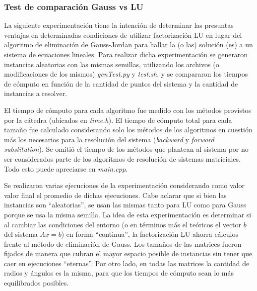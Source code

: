 \subsubsection{Test de comparación Gauss vs LU}
La siguiente experimentación tiene la intención de determinar las presuntas ventajas en determinadas condiciones de utilizar factorización LU en lugar del algoritmo de eliminación de Gauss-Jordan para hallar la (o las) solución (es) a un sistema de ecuaciones lineales. Para realizar dicha experimentación se generaron instancias aleatorias con las mismas semillas, utilizando los archivos (o modificaciones de los mismos) \emph{genTest.py} y \emph{test.sh}, y se compararon los tiempos de cómputo en función de la cantidad de puntos del sistema y la cantidad de instancias a resolver. 

El tiempo de cómputo para cada algoritmo fue medido con los métodos provistos por la cátedra (ubicados en \emph{time.h}). El tiempo de cómputo total para cada tamaño fue calculado considerando solo los métodos de los algoritmos en cuestión más los necesarios para la resolución del sistema (\emph{backward} y \emph{forward} \emph{substitution}). Se omitió el tiempo de los métodos que plantean al sistema por no ser considerados parte de los algoritmos de resolución de sistemas matriciales. Todo esto puede apreciarse en \emph{main.cpp}. 

Se realizaron varias ejecuciones de la experimentación considerando como valor valor final el promedio de dichas ejecuciones. Cabe aclarar que si bien las instancias son ``aleatorias'', se usan las mismas tanto para LU como para Gauss porque se usa la misma semilla. La idea de esta experimentación es determinar si al cambiar las condiciones del entorno (o en términos más el teóricos el vector $b$ del sistema $Ax=b$) en forma ``continua'', la factorización LU ahorra cálculos frente al método de eliminación de Gauss. Los tamaños de las matrices fueron fijados de manera que cubran el mayor espacio posible de instancias sin tener que caer en ejecuciones ``eternas''. Por otro lado, en todas las matrices la cantidad de radios y ángulos es la misma, para que los tiempos de cómputo sean lo más equilibrados posibles.
